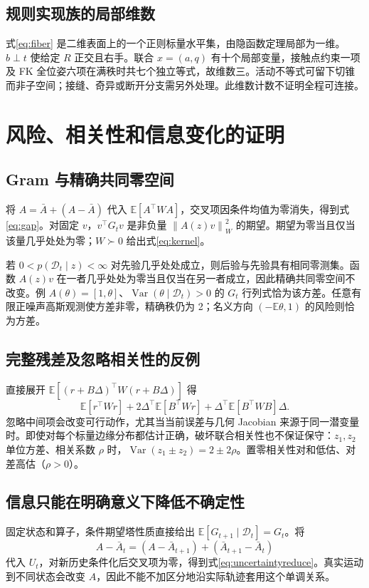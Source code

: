 \documentclass[UTF8,11pt,a4paper,fontset=fandol]{ctexart}
\numberwithin{equation}{section}
\theoremstyle{definition}
\newcommand{\E}{\mathbb E}
\newcommand{\D}{\mathcal D}
\newcommand{\norm}[1]{\left\lVert#1\right\rVert}
\DeclareMathOperator{\Var}{Var}
\begin{document}
\subsection{规则实现族的局部维数}
式\eqref{eq:fiber} 是二维表面上的一个正则标量水平集，由隐函数定理局部为一维。$b\perp t$ 使给定 $R$ 正交且右手。联合 $x=(a,q)$ 有十个局部变量，接触点约束一项及 FK 全位姿六项在满秩时共七个独立等式，故维数三。活动不等式可留下切锥而非子空间；接缝、奇异或断开分支需另外处理。此维数计数不证明全程可连接。

\section{风险、相关性和信息变化的证明}
\label{app:freedom}
\subsection{Gram 与精确共同零空间}
将 $A=\bar A+(A-\bar A)$ 代入 $\E[A^\top WA]$，交叉项因条件均值为零消失，得到式\eqref{eq:gap}。对固定 $v$，$v^\top G_tv$ 是非负量 $\norm{A(z)v}_W^2$ 的期望。期望为零当且仅当该量几乎处处为零；$W\succ0$ 给出式\eqref{eq:kernel}。

若 $0<p(\D_t\mid z)<\infty$ 对先验几乎处处成立，则后验与先验具有相同零测集。函数 $A(z)v$ 在一者几乎处处为零当且仅当在另一者成立，因此精确共同零空间不改变。例 $A(\theta)=[1,\theta]$、$\Var(\theta\mid\D_t)>0$ 的 $G_t$ 行列式恰为该方差。任意有限正噪声高斯观测使方差非零，精确秩仍为 2；名义方向 $(-\E\theta,1)$ 的风险则恰为方差。

\subsection{完整残差及忽略相关性的反例}
直接展开 $\E[(r+B\Delta)^\top W(r+B\Delta)]$ 得
\begin{equation}
 \E[r^\top Wr]+2\Delta^\top\E[B^\top Wr]
 +\Delta^\top\E[B^\top WB]\Delta.
 \label{eq:crossproof}
\end{equation}
忽略中间项会改变可行动作，尤其当当前误差与几何 Jacobian 来源于同一潜变量时。即使对每个标量边缘分布都估计正确，破坏联合相关性也不保证保守：$z_1,z_2$ 单位方差、相关系数 $\rho$ 时，$\Var(z_1\pm z_2)=2\pm2\rho$。置零相关性对和低估、对差高估（$\rho>0$）。

\subsection{信息只能在明确意义下降低不确定性}
固定状态和算子，条件期望塔性质直接给出 $\E[G_{t+1}\mid\D_t]=G_t$。将
\[
 A-\bar A_t=(A-\bar A_{t+1})+(\bar A_{t+1}-\bar A_t)
\]
代入 $U_t$，对新历史条件化后交叉项为零，得到式\eqref{eq:uncertaintyreduce}。真实运动到不同状态会改变 $A$，因此不能不加区分地沿实际轨迹套用这个单调关系。
\end{document}
